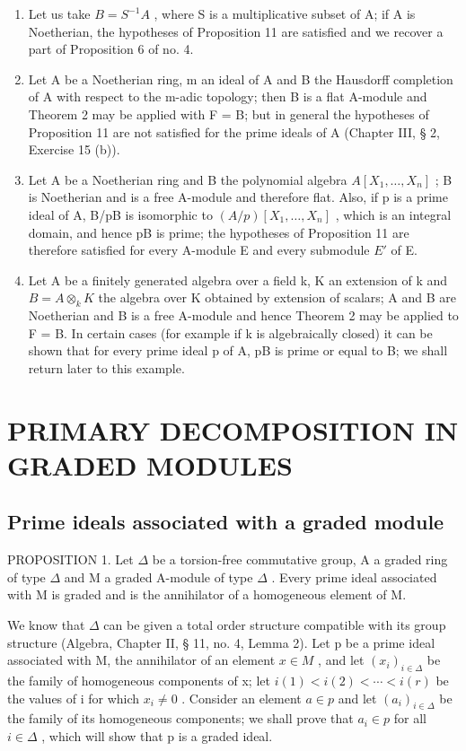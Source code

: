 \begin{enumerate}
\def\labelenumi{(\arabic{enumi})}
\item
  Let us take \(B = S^{-1}A\) , where S is a multiplicative subset of A; if A is Noetherian, the hypotheses of Proposition 11 are satisfied and we recover a part of Proposition 6 of no. 4.
\item
  Let A be a Noetherian ring, m an ideal of A and B the Hausdorff completion of A with respect to the m-adic topology; then B is a flat A-module and Theorem 2 may be applied with F = B; but in general the hypotheses of Proposition 11 are not satisfied for the prime ideals of A (Chapter III, § 2, Exercise 15 (b)).
\item
  Let A be a Noetherian ring and B the polynomial algebra \(A[X_{1},\ldots,X_{n}]\) ; B is Noetherian and is a free A-module and therefore flat. Also, if p is a prime ideal of A, B/pB is isomorphic to \((A/p)[X_{1},\ldots,X_{n}]\) , which is an integral domain, and hence pB is prime; the hypotheses of Proposition 11 are therefore satisfied for every A-module E and every submodule \(E'\) of E.
\item
  Let A be a finitely generated algebra over a field k, K an extension of k and \(B = A \otimes_{k} K\) the algebra over K obtained by extension of scalars; A and B are Noetherian and B is a free A-module and hence Theorem 2 may be applied to F = B. In certain cases (for example if k is algebraically closed) it can be shown that for every prime ideal p of A, pB is prime or equal to B; we shall return later to this example.
\end{enumerate}

\section{PRIMARY DECOMPOSITION IN GRADED MODULES}

\subsection{Prime ideals associated with a graded module}

PROPOSITION 1. Let \(\Delta\) be a torsion-free commutative group, A a graded ring of type \(\Delta\) and M a graded A-module of type \(\Delta\) . Every prime ideal associated with M is graded and is the annihilator of a homogeneous element of M.

We know that \(\Delta\) can be given a total order structure compatible with its group structure (Algebra, Chapter II, § 11, no. 4, Lemma 2). Let p be a prime ideal associated with M, the annihilator of an element \(x \in M\) , and let \((x_{i})_{i \in \Delta}\) be the family of homogeneous components of x; let \(i(1) < i(2) < \cdots < i(r)\) be the values of i for which \(x_{i} \neq 0\) . Consider an element \(a \in p\) and let \((a_{i})_{i \in \Delta}\) be the family of its homogeneous components; we shall prove that \(a_{i} \in p\) for all \(i \in \Delta\) , which will show that p is a graded ideal.

